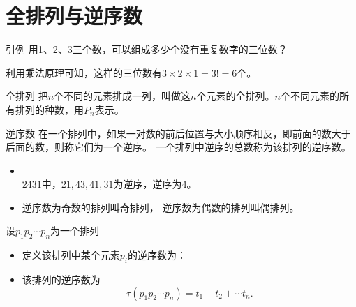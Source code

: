 \section{全排列与逆序数}

\begin{frame}
  \begin{overprint}
    \begin{center}
      \vspace{0.3cm}
    \end{center}
  \end{overprint}
  
  \begin{overprint}
    \begin{exampleblock}{引例}
      用1、2、3三个数，可以组成多少个没有重复数字的三位数？
    \end{exampleblock}
    利用乘法原理可知，这样的三位数有$3\times2\times1=3!=6$个。
    
    \begin{block}{全排列}
      把$n$个不同的元素排成一列，叫做这$n$个元素的全排列。$n$个不同元素的所有排列的种数，用$P_n$表示。
    \end{block}
    \begin{center}
    \end{center}
    \begin{block}{逆序数}
      在一个排列中，如果一对数的前后位置与大小顺序相反，即前面的数大于后面的数，则称它们为一个逆序。
      一个排列中逆序的总数称为该排列的逆序数。
    \end{block}
    \begin{itemize}
    \item  {}\\[0.2cm]
      $2431$中，$21, 43, 41, 31$为逆序，逆序为4。\\[0.4cm]
    \item
      逆序数为奇数的排列叫奇排列，
      逆序数为偶数的排列叫偶排列。
    \end{itemize}
    
    \vspace{0.2cm}
    设$p_1p_2\cdots p_n$为一个排列
    \begin{itemize}
    \item
      定义该排列中某个元素$p_i$的逆序数为：
       \\[0.4cm]
    \item
      该排列的逆序数为
      $$
      \tau(p_1p_2\cdots p_n) = t_1 + t_2 + \cdots t_n.
      $$
    \end{itemize}
    
  \end{overprint}


\end{frame}


